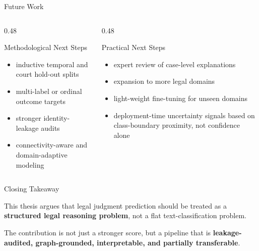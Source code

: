 \documentclass[aspectratio=169,11pt]{beamer}
\newenvironment{tightitemize}{
  \begin{itemize}
    \setlength{\itemsep}{2pt}
    \setlength{\parskip}{0pt}
}{\end{itemize}}
\newcommand{\highlight}[1]{\textcolor{ThesisBlue}{\textbf{#1}}}
\begin{document}
\begin{frame}{Future Work}
  \begin{columns}[T]
    \begin{column}{0.48\textwidth}
      \begin{block}{Methodological Next Steps}
        \begin{tightitemize}
          \item inductive temporal and court hold-out splits
          \item multi-label or ordinal outcome targets
          \item stronger identity-leakage audits
          \item connectivity-aware and domain-adaptive modeling
        \end{tightitemize}
      \end{block}
    \end{column}
    \begin{column}{0.48\textwidth}
      \begin{block}{Practical Next Steps}
        \begin{tightitemize}
          \item expert review of case-level explanations
          \item expansion to more legal domains
          \item light-weight fine-tuning for unseen domains
          \item deployment-time uncertainty signals based on class-boundary proximity, not confidence alone
        \end{tightitemize}
      \end{block}
    \end{column}
  \end{columns}
\end{frame}

\begin{frame}[plain]
  \vfill
  \begin{center}
    {\color{ThesisBlue} \Large Closing Takeaway\par}
    \vspace{1.2em}
    {\large
    This thesis argues that legal judgment prediction should be treated as a \highlight{structured legal reasoning problem}, not a flat text-classification problem.\par}
    \vspace{1.0em}
    {\large
    The contribution is not just a stronger score, but a pipeline that is \highlight{leakage-audited, graph-grounded, interpretable, and partially transferable}.}
  \end{center}
  \vfill
\end{frame}
\end{document}

